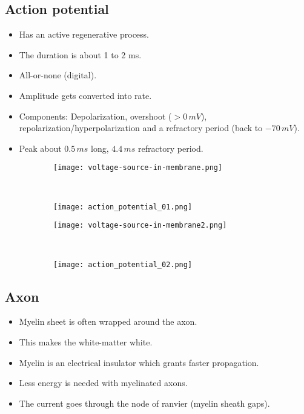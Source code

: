 \documentclass[main]{subfiles}
\begin{document}
\subsection{Action potential}
\begin{itemize}[noitemsep,nolistsep]
	\item Has an active regenerative process.
	\item The duration is about 1 to 2 ms.
	\item All-or-none (digital).
	\item Amplitude gets converted into rate.
	\item Components: Depolarization, overshoot ($>0\,mV$), repolarization/hyperpolarization and a refractory period (back to $-70\,mV$).
	\item Peak about $0.5\,ms$ long, $4.4\,ms$ refractory period.
\end{itemize}
\begin{figure}[H]
	\centering
	\begin{subfigure}[b]{0.5\textwidth}
		\centering
		\texttt{[image: voltage-source-in-membrane.png]}
	\end{subfigure}%
	~
	\begin{subfigure}[b]{0.5\textwidth}
		\centering
		\texttt{[image: action\_potential\_01.png]}
	\end{subfigure}
\end{figure}
\begin{figure}[H]
	\centering
	\begin{subfigure}[b]{0.5\textwidth}
		\centering
		\texttt{[image: voltage-source-in-membrane2.png]}
	\end{subfigure}%
	~
	\begin{subfigure}[b]{0.5\textwidth}
		\centering
		\texttt{[image: action\_potential\_02.png]}
	\end{subfigure}
\end{figure}

\subsection{Axon}
\begin{itemize}[noitemsep,nolistsep]
	\item Myelin sheet is often wrapped around the axon.
	\item This makes the white-matter white.
	\item Myelin is an electrical insulator which grants faster propagation.
	\item Less energy is needed with myelinated axons.
	\item The current goes through the node of ranvier (myelin sheath gaps).
\end{itemize}
\end{document}
